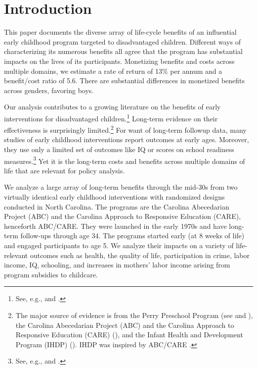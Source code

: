 \tableofcontents

\restoregeometry

\clearpage
\doublespacing

\setcounter{page}{0}

\section{Introduction}

This paper documents the diverse array of life-cycle benefits of an influential early childhood program targeted to disadvantaged children. Different ways of characterizing its numerous benefits all agree that the program has substantial impacts on the lives of its participants. Monetizing benefits and costs across multiple domains, we estimate a rate of return of 13\% per annum and a benefit/cost ratio of 5.6. There are substantial differences in monetized benefits across genders, favoring boys.

Our analysis contributes to a growing literature on the benefits of early interventions for disadvantaged children.\footnote{See, e.g., \cite{Currie_2011_AER} and \cite{Elango_Hojman_etal_2016_Early-Edu}.} Long-term evidence on their effectiveness is surprisingly limited.\footnote{The major source of evidence is from the Perry Preschool Program (see \citealp{Schweinhart_Montie_ea_2005_BOOKlifetime} and \citealp{Heckman_Moon_etal_2010_RateofReturn,Heckman_Moon_etal_2010_QE}), the Carolina Abecedarian Project (ABC) and the Carolina Approach to Responsive Education (CARE) (\citealp{Ramey_Campbell_etal_2000_ADS,Ramey-etal_2012-ABC}), and the Infant Health and Development Program (IHDP) (\citealp{Gross_Spiker_etal_1997_BOOKHelpinglowbirth,Duncan_Sojourner_2013_JHR}). IHDP was inspired by ABC/CARE \citep[][]{Gross_Spiker_etal_1997_BOOKHelpinglowbirth}.} For want of long-term followup data, many studies of early childhood interventions report outcomes at early ages. Moreover, they use only a limited set of outcomes like IQ or scores on school readiness measures.\footnote{See, e.g., \cite{Kline_Walters_2016_QJE} and \cite{Weiland_2013_CD_Impacts-of-Pre-K}.} Yet it is the long-term costs and benefits across multiple domains of life that are relevant for policy analysis.

We analyze a large array of long-term benefits through the mid-30s from two virtually identical early childhood interventions with randomized designs conducted in North Carolina. The programs are the Carolina Abecedarian Project (ABC) and the Carolina Approach to Responsive Education (CARE), henceforth ABC/CARE. They were launched in the early 1970s and have long-term follow-ups through age 34. The programs started early (at 8 weeks of life) and engaged participants to age 5. We analyze their impacts on a variety of life-relevant outcomes such as health, the quality of life, participation in crime, labor income, IQ, schooling, and increases in mothers' labor income arising from program subsidies to childcare.

